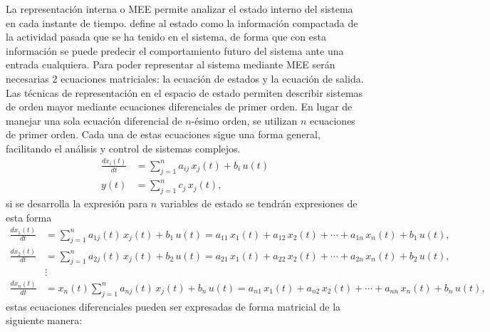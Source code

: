     La representación interna o \ac{MEE}  permite analizar el estado interno del sistema en cada instante de tiempo. \textcite{MEE} define al estado como la información compactada de la actividad pasada que se ha tenido en el sistema, de forma que con esta información se puede predecir el comportamiento futuro del sistema ante una entrada cualquiera. 
    Para poder representar al sistema mediante \ac{MEE} serán necesarias 2 ecuaciones matriciales: la ecuación de estados y la ecuación de salida.
    Las técnicas de representación en el espacio de estado permiten describir sistemas de orden mayor mediante ecuaciones diferenciales de primer orden. En lugar de manejar una sola ecuación diferencial de $n$-ésimo orden, se utilizan $n$ ecuaciones de primer orden. Cada una de estas ecuaciones sigue una forma general, facilitando el análisis y control de sistemas complejos.
    \begin{align*}
        \frac{dx_i(t)}{dt} &= \sum_{j=1}^n a_{ij}\,x_j(t) + b_{i}\,u(t)\\
        y(t) &= \sum_{j=1}^n c_j\,x_j(t),
    \end{align*}
    si se desarrolla la expresión para $n$ variables de estado se tendrán expresiones de esta forma
    \begin{align*}
        \frac{dx_1(t)}{dt} &= \sum_{j=1}^n a_{1j}(t)\,x_j(t) + b_1\,u(t)= a_{11}\,x_1(t) + a_{12}\,x_2(t) + \cdots + a_{1n}\,x_n(t) + b_1\,u(t), \\
        \frac{dx_2(t)}{dt} &= \sum_{j=1}^n a_{2j}(t)\,x_j(t) + b_2\,u(t)= a_{21}\,x_1(t) + a_{22}\,x_2(t) + \cdots + a_{2n}\,x_n(t) + b_2\,u(t), \\
        &\vdots \\
        \frac{dx_n(t)}{dt} &= x_n(t) \sum_{j=1}^n a_{nj}(t)\,x_j(t) + b_n\,u(t) = a_{n1}\,x_1(t) + a_{n2}\,x_2(t) + \cdots + a_{nn}\,x_n(t) + b_n\,u(t),
    \end{align*}
    estas ecuaciones diferenciales pueden ser expresadas de forma matricial de  la siguiente manera: 
